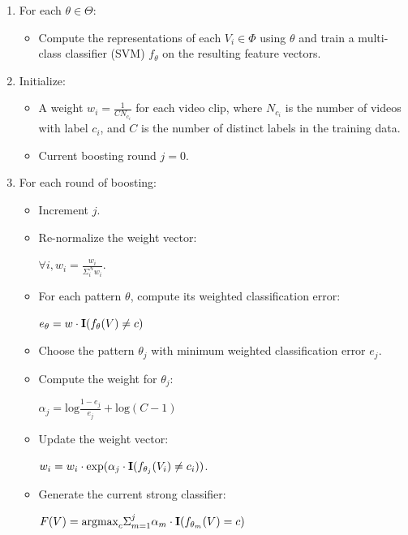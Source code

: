 \documentclass{bmvc2k}
\begin{document}
			\begin{enumerate}

				\item For each $\theta \in \Theta$:
					\begin{itemize}
            \item Compute the representations of each $V_i \in \Phi$ using $\theta$
						and train a multi-class classifier (SVM) $f_\theta$ on the
            resulting feature vectors.
					\end{itemize}

				\item Initialize:
					\begin{itemize}
						\item A weight $w_i = \frac{1}{C N_{c_i}}$ for each video clip,
							where $N_{c_i}$ is the number of videos with label $c_i$,
              and $C$ is the number of distinct labels in the training data.
						\item Current boosting round $j=0$.
					\end{itemize}

				\item For each round of boosting:
					\begin{itemize}
						\item Increment $j$.
						\item Re-normalize the weight vector:
              \begin{center}
              $\forall i, w_i = \frac{w_i}{\Sigma_i^N w_i}$.
              \end{center}
					  \item For each pattern $\theta$,
              compute its weighted classification error:
              \begin{center}
              $e_\theta = w \cdot \mbox{\textbf{I}}(f_\theta(V) \neq c)$
              \end{center}
						\item Choose the pattern $\theta_j$ with minimum weighted
              classification error $e_j$.
						\item Compute the weight for $\theta_j$:
              \begin{center}
              $\alpha_j = \mbox{log} \frac{1 - e_j}{e_j} + \mbox{log}(C-1)$
              \end{center}
						\item Update the weight vector:
              \begin{center}
							$w_i = w_i \cdot \mbox{exp}(\alpha_j \cdot
							\mbox{\textbf{I}}(f_{\theta_j}(V_i) \neq c_i))$.
              \end{center}
						\item Generate the current strong classifier:
              \begin{center}
							$F(V) = \mbox{argmax}_c \Sigma_{m=1}^j \alpha_m \cdot
							\mbox{\textbf{I}}(f_{\theta_m}(V) = c)$
              \end{center}
					\end{itemize}

			\end{enumerate}
	
\end{document}
